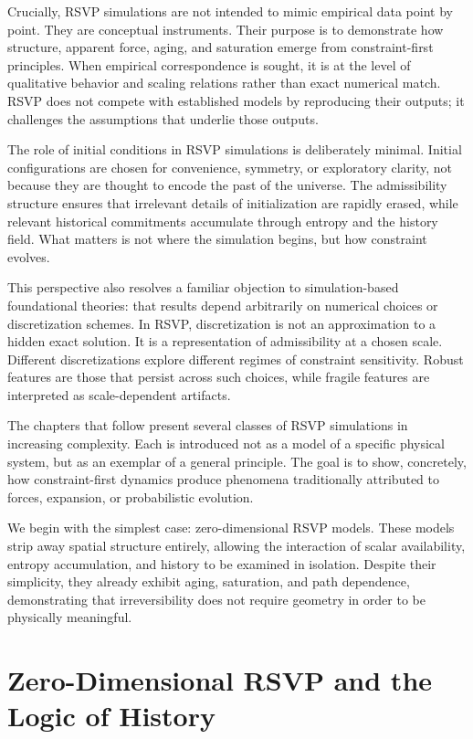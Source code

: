 \documentclass[11pt,oneside]{book}
\begin{document}
Crucially, RSVP simulations are not intended to mimic empirical data point by point. They are conceptual instruments. Their purpose is to demonstrate how structure, apparent force, aging, and saturation emerge from constraint-first principles. When empirical correspondence is sought, it is at the level of qualitative behavior and scaling relations rather than exact numerical match. RSVP does not compete with established models by reproducing their outputs; it challenges the assumptions that underlie those outputs.

The role of initial conditions in RSVP simulations is deliberately minimal. Initial configurations are chosen for convenience, symmetry, or exploratory clarity, not because they are thought to encode the past of the universe. The admissibility structure ensures that irrelevant details of initialization are rapidly erased, while relevant historical commitments accumulate through entropy and the history field. What matters is not where the simulation begins, but how constraint evolves.

This perspective also resolves a familiar objection to simulation-based foundational theories: that results depend arbitrarily on numerical choices or discretization schemes. In RSVP, discretization is not an approximation to a hidden exact solution. It is a representation of admissibility at a chosen scale. Different discretizations explore different regimes of constraint sensitivity. Robust features are those that persist across such choices, while fragile features are interpreted as scale-dependent artifacts.

The chapters that follow present several classes of RSVP simulations in increasing complexity. Each is introduced not as a model of a specific physical system, but as an exemplar of a general principle. The goal is to show, concretely, how constraint-first dynamics produce phenomena traditionally attributed to forces, expansion, or probabilistic evolution.

We begin with the simplest case: zero-dimensional RSVP models. These models strip away spatial structure entirely, allowing the interaction of scalar availability, entropy accumulation, and history to be examined in isolation. Despite their simplicity, they already exhibit aging, saturation, and path dependence, demonstrating that irreversibility does not require geometry in order to be physically meaningful.

\chapter{Zero-Dimensional RSVP and the Logic of History}
\end{document}
